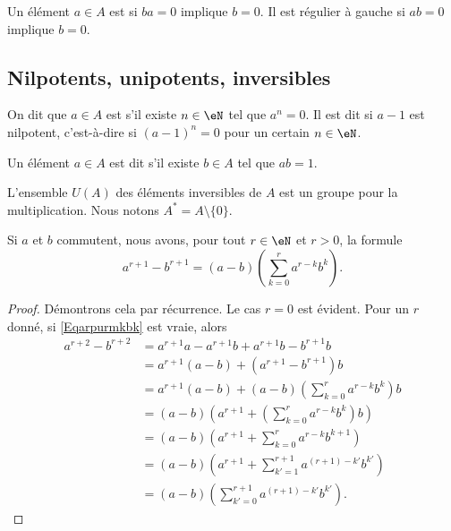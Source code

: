 \begin{definition}
Un élément \( a\in A\) est  si \( ba=0\) implique \( b=0\). Il est régulier à gauche si \( ab=0\) implique \( b=0\).
\end{definition}

\subsection{Nilpotents, unipotents, inversibles}

\begin{definition}
	On dit que \( a \in A \) est  s'il existe \( n \in \eN \) tel que \( a^n = 0 \). Il est dit  si \( a-1\) est nilpotent, c'est-à-dire si \( (a-1)^n =0\) pour un certain \( n \in \eN \).

	Un élément \( a \in A \) est dit  s'il existe \( b \in A \) tel que \( ab = 1 \).
\end{definition}

L'ensemble \( U(A)\) des éléments inversibles de \( A\) est un groupe pour la multiplication. Nous notons \( A^*=A\setminus\{ 0 \}\).

\begin{lemma}
    Si \( a\) et \( b\) commutent, nous avons, pour tout \( r \in \eN \) et \( r > 0\), la formule
    \begin{equation}        \label{Eqarpurmkbk}
        a^{r+1}-b^{r+1}=(a-b)\left(\sum_{k=0}^ra^{r-k}b^k\right).
    \end{equation}
\end{lemma}

\begin{proof}
  Démontrons cela par récurrence. Le cas \( r = 0 \) est évident. Pour
  un \( r \) donné, si \eqref{Eqarpurmkbk} est vraie, alors
  \begin{align*}
    a^{r+2}-b^{r+2}&= a^{r+1}a - a^{r+1}b +a^{r+1}b - b^{r+1}b\\
    &= a^{r+1}(a - b) + (a^{r+1} - b^{r+1})b\\
    &= a^{r+1}(a - b) + (a-b)\left(\sum_{k=0}^ra^{r-k}b^k\right)b\\
    &= (a - b) \left(a^{r+1} + \left(\sum_{k=0}^ra^{r-k}b^k\right)b\right)\\
    &= (a - b) \left(a^{r+1} + \sum_{k=0}^ra^{r-k}b^{k + 1}\right)\\
    &= (a - b) \left(a^{r+1} + \sum_{k'=1}^{r+1}a^{(r+1)-k'}b^{k'}\right)\\
    &= (a - b) \left(\sum_{k'=0}^{r+1}a^{(r+1)-k'}b^{k'}\right).
  \end{align*}
\end{proof}

